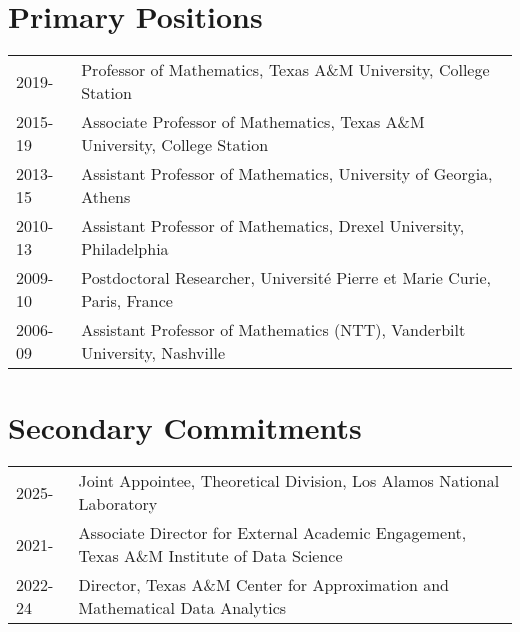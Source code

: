 \documentclass[11pt]{article}
\begin{document}
\section{Primary Positions}
\begin{tabular}{ll}

2019- & Professor of Mathematics, Texas A\&M University, College Station\\
2015-19 & Associate Professor of Mathematics, Texas A\&M University, College Station\\
2013-15 & Assistant Professor of Mathematics, University of Georgia, Athens\\
2010-13 & Assistant Professor of Mathematics,  Drexel University, Philadelphia\\
2009-10 & Postdoctoral Researcher,  Universit\'{e} Pierre et Marie Curie, Paris, France\\
2006-09 & Assistant Professor of Mathematics (NTT),  Vanderbilt University, Nashville
\end{tabular}


\section{Secondary Commitments} %
\begin{tabular}{ll}
2025-  & Joint Appointee,  Theoretical Division, Los Alamos National Laboratory\\
2021-  & Associate Director for External Academic Engagement, Texas A\&M Institute of Data Science\\
2022-24 & Director, Texas A\&M Center for Approximation and Mathematical Data Analytics
\end{tabular}
\end{document}
